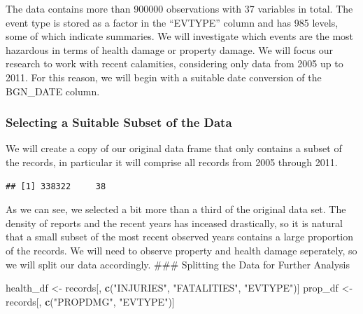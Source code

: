 \documentclass[]{article}
\newenvironment{Shaded}{\begin{snugshade}}{\end{snugshade}}
\newcommand{\KeywordTok}[1]{\textcolor[rgb]{0.13,0.29,0.53}{\textbf{{#1}}}}
\newcommand{\DataTypeTok}[1]{\textcolor[rgb]{0.13,0.29,0.53}{{#1}}}
\newcommand{\DecValTok}[1]{\textcolor[rgb]{0.00,0.00,0.81}{{#1}}}
\newcommand{\StringTok}[1]{\textcolor[rgb]{0.31,0.60,0.02}{{#1}}}
\newcommand{\NormalTok}[1]{{#1}}
\begin{document}
The data contains more than 900000 observations with 37 variables in
total. The event type is stored as a factor in the ``EVTYPE'' column and
has 985 levels, some of which indicate summaries. We will investigate
which events are the most hazardous in terms of health damage or
property damage. We will focus our research to work with recent
calamities, considering only data from 2005 up to 2011. For this reason,
we will begin with a suitable date conversion of the BGN\_DATE column.

\begin{Shaded}
\end{Shaded}

\subsubsection{Selecting a Suitable Subset of the
Data}\label{selecting-a-suitable-subset-of-the-data}

We will create a copy of our original data frame that only contains a
subset of the records, in particular it will comprise all records from
2005 through 2011.

\begin{Shaded}
\end{Shaded}

\begin{verbatim}
## [1] 338322     38
\end{verbatim}

As we can see, we selected a bit more than a third of the original data
set. The density of reports and the recent years has inceased
drastically, so it is natural that a small subset of the most recent
observed years contains a large proportion of the records. We will need
to observe property and health damage seperately, so we will split our
data accordingly. \#\#\# Splitting the Data for Further Analysis

\begin{Shaded}
\begin{Highlighting}[]
\NormalTok{health_df <-}\StringTok{ }\NormalTok{records[, }\KeywordTok{c}\NormalTok{(}\StringTok{"INJURIES"}\NormalTok{, }\StringTok{"FATALITIES"}\NormalTok{, }\StringTok{"EVTYPE"}\NormalTok{)]}
\NormalTok{prop_df <-}\StringTok{ }\NormalTok{records[, }\KeywordTok{c}\NormalTok{(}\StringTok{"PROPDMG"}\NormalTok{, }\StringTok{"EVTYPE"}\NormalTok{)]}
\end{Highlighting}
\end{Shaded}
\end{document}

